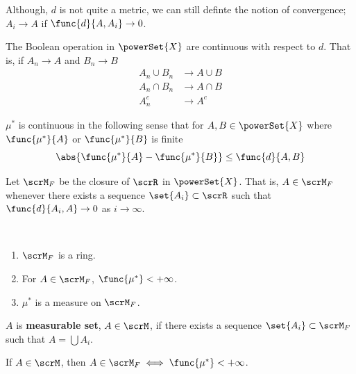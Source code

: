 Although, \(d\) is not quite a metric, we can still definte the notion of convergence; \(A_i \to A\) if \(\func{d}{A,A_i} \to 0\).

\begin{proposition}
    The Boolean operation in \(\powerSet{X}\) are continuous with respect to \(d\). That is, if \(A_n \to A\) and \(B_n \to B\)
    \begin{align*}
        A_n \cup B_n &\to A \cup B\\
        A_n \cap B_n &\to A \cap B\\
        A_n^c &\to A^c
    \end{align*}
\end{proposition}

\begin{proposition}
    \(\mu^{\ast}\) is continuous in the following sense that for \(A,B \in \powerSet{X}\) where  \(\func{\mu^{\ast}}{A}\) or \(\func{\mu^{\ast}}{B}\) is finite 
    \begin{equation*}
        \abs{\func{\mu^{\ast}}{A} - \func{\mu^{\ast}}{B}} \leq \func{d}{A,B}
    \end{equation*}
\end{proposition}

\begin{definition}
    Let \(\scrM_F\) be the closure of \(\scrR\) in \(\powerSet{X}\). That is, \(A \in \scrM_F\) whenever there exists a sequence \(\set{A_i} \subset \scrR\) such that \(\func{d}{A_i,A} \to 0\) as \(i \to \infty\).
\end{definition}

\begin{theorem}
    \ 
    \begin{enumerate}
        \item \(\scrM_F\) is a ring.
        \item For \(A \in \scrM_F\), \(\func{\mu^{\ast}} < + \infty\).
        \item \(\mu^{\ast}\) is a measure on \(\scrM_F\).
    \end{enumerate}
\end{theorem}

\begin{definition}
    \(A\) is \textbf{measurable set}, \(A \in \scrM\), if there exists a sequence \(\set{A_i} \subset \scrM_F\) such that \(A = \bigcup A_i\).
\end{definition}

\begin{theorem}
    If \(A \in \scrM\), then \(A \in \scrM_F \iff \func{\mu^{\ast}} < + \infty\).
\end{theorem}


